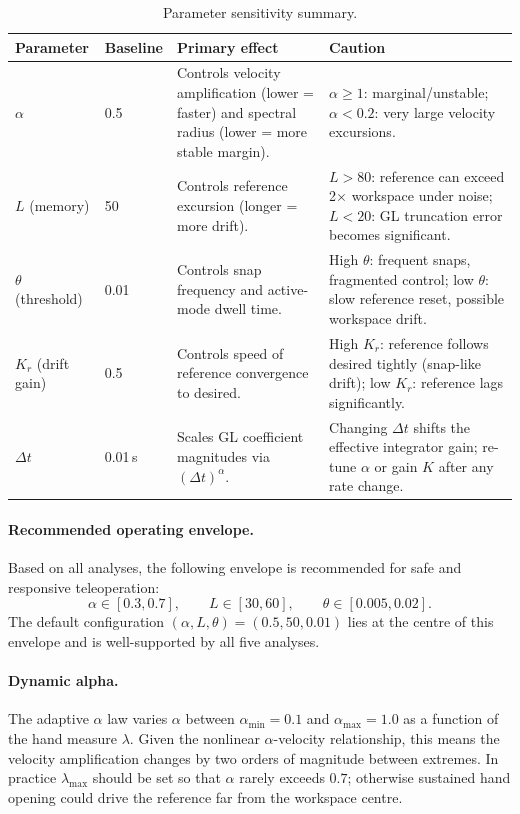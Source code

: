 \documentclass[11pt,a4paper]{article}
\theoremstyle{definition}
\begin{document}
\begin{table}[ht]
  \centering
  \caption{Parameter sensitivity summary.}
  \label{tab:synthesis}
  \begin{tabular}{p{2.4cm} p{2.0cm} p{4.5cm} p{4.5cm}}
    \toprule
    Parameter & Baseline & Primary effect & Caution \\
    \midrule
    $\alpha$ & 0.5 &
      Controls velocity amplification (lower = faster) and spectral radius
      (lower = more stable margin). &
      $\alpha \geq 1$: marginal/unstable; $\alpha < 0.2$: very large
      velocity excursions. \\[4pt]
    $L$ (memory) & 50 &
      Controls reference excursion (longer = more drift). &
      $L > 80$: reference can exceed 2$\times$ workspace under noise;
      $L < 20$: GL truncation error becomes significant. \\[4pt]
    $\theta$ (threshold) & 0.01 &
      Controls snap frequency and active-mode dwell time. &
      High $\theta$: frequent snaps, fragmented control; low $\theta$:
      slow reference reset, possible workspace drift. \\[4pt]
    $K_r$ (drift gain) & 0.5 &
      Controls speed of reference convergence to desired. &
      High $K_r$: reference follows desired tightly (snap-like drift);
      low $K_r$: reference lags significantly. \\[4pt]
    $\Delta t$ & 0.01\,s &
      Scales GL coefficient magnitudes via $(\Delta t)^\alpha$. &
      Changing $\Delta t$ shifts the effective integrator gain; re-tune
      $\alpha$ or gain $K$ after any rate change. \\
    \bottomrule
  \end{tabular}
\end{table}

\paragraph{Recommended operating envelope.}
Based on all analyses, the following envelope is recommended for safe and
responsive teleoperation:
\begin{equation}
  \alpha \in [0.3, 0.7],
  \qquad
  L \in [30, 60],
  \qquad
  \theta \in [0.005, 0.02].
  \label{eq:envelope}
\end{equation}
The default configuration $(\alpha, L, \theta) = (0.5, 50, 0.01)$ lies at
the centre of this envelope and is well-supported by all five analyses.

\paragraph{Dynamic alpha.}
The adaptive $\alpha$ law varies $\alpha$ between $\alpha_{\min} = 0.1$ and
$\alpha_{\max} = 1.0$ as a function of the hand measure $\lambda$.  Given
the nonlinear $\alpha$-velocity relationship, this means the velocity
amplification changes by two orders of magnitude between extremes.  In
practice $\lambda_{\max}$ should be set so that $\alpha$ rarely exceeds
$0.7$; otherwise sustained hand opening could drive the reference far from
the workspace centre.
\end{document}
